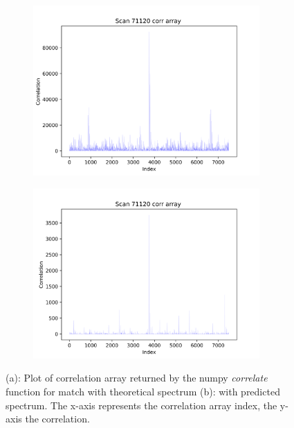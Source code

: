 \documentclass[11pt]{article}
\begin{document}
\begin{figure}
\centering
\begin{subfigure}[b]{1\textwidth}
\centering
    \includegraphics[width=0.95\textwidth]{figs/corrtheo.png}
   \caption{}
   \label{fig:corrtheo} 
\end{subfigure}
\begin{subfigure}[b]{1\textwidth}
\centering
   \includegraphics[width=0.95\textwidth]{figs/corrpredict.png}
   \caption{}
   \label{fig:corrpredict}
\end{subfigure}
\caption{(a): Plot of correlation array returned by the numpy \textit{correlate} function for match with theoretical spectrum (b): with predicted spectrum. The x-axis represents the correlation array index, the y-axis the correlation.}
\label{predandtheocorr}
\end{figure}
\end{document}
